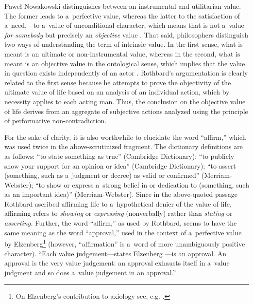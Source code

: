 \begin{artengenv}{Paweł Nowakowski}
{\parencite*[][pp.28–29]{Elzenberg1990Wartość} %
 distinguishes between an instrumental and utilitarian value. The former leads to a~perfective value, whereas the latter to the satisfaction of a~need.}---to a~value of unconditional character, which means that is not a~value \textit{for somebody} but precisely an \textit{objective} value 
\parencites[see][p.21ff]{Elzenberg1990Wartość}[][p.77]{Raz2001Value}[][]{Schroeder2021Value}[][]{Zimmerman2019Intrinsic}. %
 That said, philosophers distinguish two ways of understanding the term of intrinsic value. In the first sense, what is meant is an ultimate or non-instrumental value, whereas in the second, what is meant is an objective value in the ontological sense, which implies that the value in question exists independently of an actor 
\parencite[see][p.8]{Frey1993Value}. %
 Rothbard's argumentation is clearly related to the first sense because he attempts to prove the objectivity of the ultimate value of life based on an analysis of an individual action, which by necessity applies to each acting man. Thus, the conclusion on the objective value of life derives from an aggregate of subjective actions analyzed using the principle of performative non-contradiction.



For the sake of clarity, it is also worthwhile to elucidate the word ``affirm,'' which was used twice in the above-scrutinized fragment. The dictionary definitions are as follows: ``to state something as true'' (Cambridge Dictionary); ``to publicly show your support for an opinion or idea'' (Cambridge Dictionary); ``to assert (something, such as a~judgment or decree) as valid or confirmed'' (Merriam-Webster); ``to show or express a~strong belief in or dedication to (something, such as an important idea)'' (Merriam-Webster). Since in the above-quoted passage Rothbard ascribed affirming life to a~hypothetical denier of the value of life, affirming refers to \textit{showing} or \textit{expressing} (nonverbally) rather than \textit{stating} or \textit{asserting.} Further, the word ``affirm,'' as used by Rothbard, seems to have the same meaning as the word ``approval,'' used in the context of a~perfective value by Elzenberg\footnote{On Elzenberg's contribution to axiology see, e.g. 
\parencite[][pp.73–86]{Porębski2019Elzenberg:}.%
} (however, ``affirmation'' is a~word of more unambiguously positive character). ``Each value judgement---states Elzenberg 
\parencite*[][p.25]{Elzenberg1990Wartość}%
---is an approval. An approval is the very value judgement: an approval exhausts itself in a~value judgment and so does a~value judgement in an approval.''




\end{artengenv}
